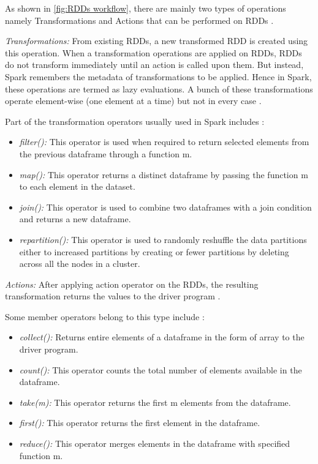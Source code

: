 \par As shown in \ref{fig:RDDs workflow}, there are mainly two types of operations namely Transformations and Actions that can be performed on RDDs \cite{zaharia2010spark,spark:website,karau2015learning}. 

\textit{Transformations:} From existing RDDs, a new transformed RDD is created using this operation. When a transformation operations are applied on RDDs, RDDs do not transform immediately until an action is called upon them. But instead, Spark remembers the metadata of transformations to be applied. Hence in Spark, these operations are termed as lazy evaluations. A bunch of these transformations operate element-wise (one element at a time) but not in every case \cite{karau2015learning}.

\par Part of the transformation operators usually used in Spark includes \cite{spark:website}:

\begin{itemize}
\item \textit{filter():} This operator is used when required to return selected elements from the previous dataframe through a function m.
\item \textit{map():} This operator returns a distinct dataframe by passing the function m to each element in the dataset.
\item \par\textit{join():} This operator is used to combine two dataframes with a join condition and returns a new dataframe. 
\item \textit{repartition():} This operator is used to randomly reshuffle the data partitions either to increased partitions by creating or fewer partitions by deleting across all the nodes in a cluster.
\end{itemize}

\textit{Actions:} After applying action operator on the RDDs, the resulting transformation returns the values to the driver program \cite{spark:website}.
\newline
\par Some member operators belong to this type include \cite{spark:website}: 

\begin{itemize}
\item \textit{collect():} Returns entire elements of a dataframe in the form of array to the driver program.
\item \textit{count():} This operator counts the total number of elements available in the dataframe.
\item \textit{take(m):} This operator returns the first m elements from the dataframe.
\item \textit{first():} This operator returns the first element in the dataframe.
\item \textit{reduce():} This operator merges elements in the dataframe with specified function m.
\end{itemize}


